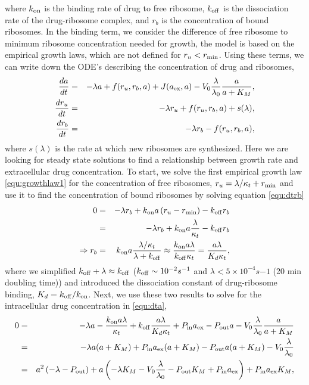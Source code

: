 where $k_{\mathrm{on}}$ is the binding rate of drug to free ribosome, $k_{\mathrm{off}}$ is the dissociation rate of the drug-ribosome complex, and $r_b$ is the concentration of bound ribosomes. In the binding term, we consider the difference of free ribosome to minimum ribosome concentration needed for growth, the model is based on the empirical growth laws, which are not defined for $r_u < r_{\mathrm{min}}$.
Using these terms, we can write down the ODE's describing the concentration of drug and ribosomes,
\begin{eqnarray}
    {d a\over d t} &=& -\lambda a + f(r_u, r_b, a) + J(a_{\mathrm{ex}}, a) - V_0 {\lambda\over\lambda_0}{a\over a + K_M},\label{equ:dta}\\
    {dr_u\over dt} &=& -\lambda r_u + f(r_u, r_b, a) + s(\lambda),\label{equ:dtru}\\
    {dr_b\over dt} &=& -\lambda r_b - f(r_u, r_b, a)\label{equ:dtrb},
\end{eqnarray}
where $s(\lambda)$ is the rate at which new ribosomes are synthesized. Here we are looking for steady state solutions to find a relationship between growth rate and extracellular drug concentration.
To start, we solve the first empirical growth law \ref{equ:growthlaw1}  for the concentration of free ribosomes, $r_u = \lambda/\kappa_t + r_{\mathrm{min}}$ and use it to find the concentration of bound ribosomes by solving equation \ref{equ:dtrb}
\begin{eqnarray}
    0 &=& -\lambda r_b + k_{\mathrm{on}}a\,(r_u-r_{\mathrm{min}}) - k_{\mathrm{off}} r_b \nonumber\\
    &=& -\lambda r_b + k_{\mathrm{on}}a\frac{\lambda}{\kappa_t} - k_{\mathrm{off}} r_b \nonumber\\
    \Rightarrow r_b &=& k_{\mathrm{on}}a{\lambda/\kappa_t \over \lambda + k_{\mathrm{off}} } \approx {k_{\mathrm{on}} a\lambda \over k_{\mathrm{off}} \kappa_t}={a\lambda \over K_d \kappa_t},
\end{eqnarray}
where we simplified $k_{\mathrm{off}} + \lambda \approx k_{\mathrm{off}}$ ($k_{\mathrm{off}}\sim 10^{-2} s^{-1}$ \cite{barrenechea2021complementary} and $\lambda < 5\times 10^{-4} s{-1}$ (20 min doubling time)) and introduced the dissociation constant of drug-ribosome binding, $K_d = k_{\mathrm{off}}/k_{\mathrm{on}}$.
Next, we use these two results to solve for the intracellular drug concentration in \ref{equ:dta},
\begin{eqnarray}
    0&=&-\lambda a -\frac{k_{\mathrm{on}} a \lambda}{\kappa_t}+ k_{\mathrm{off}} {a\lambda \over K_d \kappa_t}+ P_{\mathrm{in}} a_{\mathrm{ex}} - P_{\mathrm{out}} a - V_0 {\lambda \over \lambda_0} {a \over a + K_M} \nonumber\\
    &=& -\lambda a (a+K_M) + P_{\mathrm{in}} a_{\mathrm{ex}} (a+K_M) - P_{\mathrm{out}} a(a+K_M) - V_0 \frac{\lambda}{\lambda_0}\nonumber \\
    &=& a^2 \left( -\lambda - P_{\mathrm{out}} \right) + a \left(-\lambda K_M - V_0 {\lambda \over \lambda_0} - P_{\mathrm{out}} K_M + P_{\mathrm{in}} a_{\mathrm{ex}}\right) + P_{\mathrm{in}} a_{\mathrm{ex}} K_M,\label{equ:lambda_poly_1}
\end{eqnarray}
